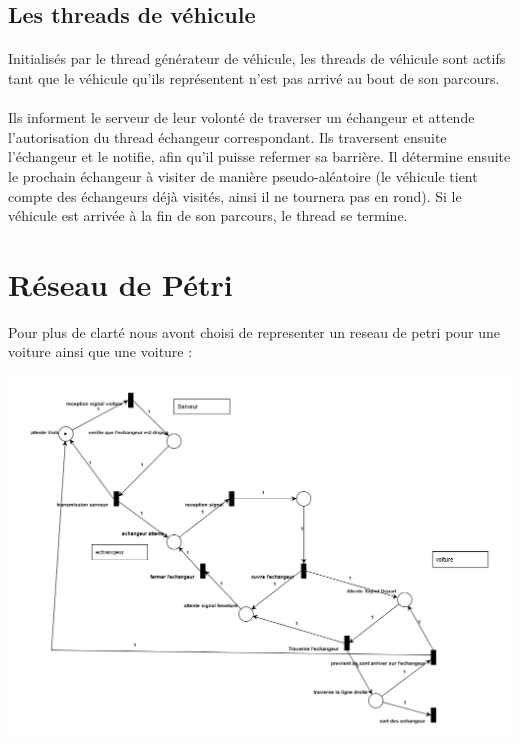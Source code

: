 \documentclass{report}
\begin{document}
	\subsection{Les threads de véhicule}
	\paragraph{}
	Initialisés par le thread générateur de véhicule, les threads de véhicule sont actifs tant que le véhicule qu'ils représentent n'est pas arrivé au bout de son parcours.
	\paragraph{}
	Ils informent le serveur de leur volonté de traverser un échangeur et attende l'autorisation du thread échangeur correspondant. Ils traversent ensuite l'échangeur et le notifie, afin qu'il puisse refermer sa barrière. Il détermine ensuite le prochain échangeur à visiter de manière pseudo-aléatoire (le véhicule tient compte des échangeurs déjà visités, ainsi il ne tournera pas en rond). Si le véhicule est arrivée à la fin de son parcours, le thread se termine.
	\newpage
	\section{Réseau de Pétri}
	Pour plus de clarté nous avont choisi de representer un reseau de petri pour une voiture ainsi que une voiture :
	\begin{center}
	\includegraphics[scale=0.4]{Petri}
	\end{center}
	
		\newpage
	
\end{document}
